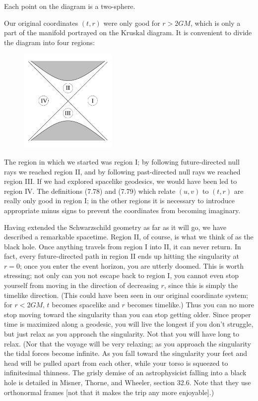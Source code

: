 \documentclass[12pt]{article}
\begin{document}
\noindent Each point on the diagram is a two-sphere.

\eject

Our original coordinates $(t,r)$ were only good for $r>2GM$, which is
only a part of the manifold portrayed on the Kruskal diagram.  It is
convenient to divide the diagram into four regions:

\begin{figure}[h]
  \centerline{
  \includegraphics[height=5cm]{pdf/seven15}}
\end{figure}

\noindent The region in which we started was region I; by following
future-directed null rays we reached region II, and by following
past-directed null rays we reached region III.  If we had explored
spacelike geodesics, we would have been led to region IV.
The definitions (7.78) and (7.79) which relate $(u,v)$ to $(t,r)$
are really only good in region I; in the other regions it is 
necessary to introduce appropriate minus signs to prevent the
coordinates from becoming imaginary.

Having extended the Schwarzschild geometry as far as it will go,
we have described a remarkable spacetime.  Region II, of course,
is what we think of as the black hole.  Once anything travels from
region I into II, it can never return.  In fact, every future-directed
path in region II ends up hitting the singularity at $r=0$; once you
enter the event horizon, you are utterly doomed.  This is worth
stressing; not only can you not escape back to region I, you cannot
even stop yourself from moving in the direction of decreasing $r$,
since this is simply the timelike direction.  (This could
have been seen in our original coordinate system; for $r<2GM$, $t$
becomes spacelike and $r$ becomes timelike.)  Thus you can no more
stop moving toward the singularity than you can stop getting older.
Since proper time is maximized along a geodesic, you will live the
longest if you don't struggle, but just relax as you approach the
singularity.  Not that you will have long to relax.  (Nor that the
voyage will be very relaxing; as you approach the singularity the
tidal forces become infinite.  As you fall toward the singularity
your feet and head will be pulled apart from each other, while 
your torso is squeezed to infinitesimal thinness.  The grisly
demise of an astrophysicist falling into a black hole is detailed
in Misner, Thorne, and Wheeler, section 32.6.  Note that they use
orthonormal frames [not that it makes the trip any more enjoyable].)
\end{document}
